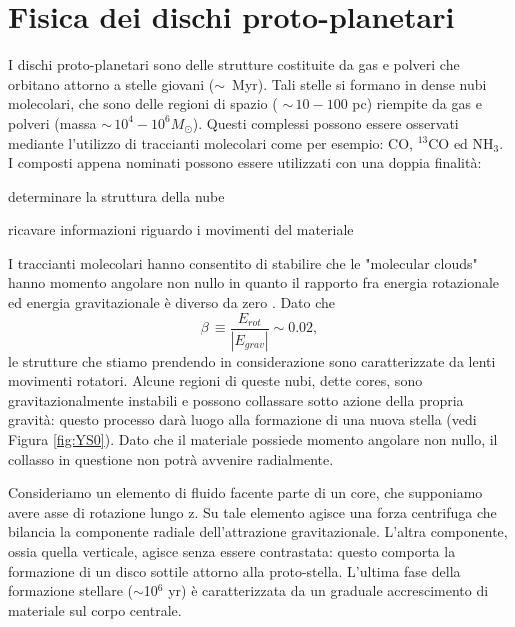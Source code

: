 \chapter{Fisica dei dischi proto-planetari} \label{cap:FisDischi}
I dischi proto-planetari sono delle strutture costituite da gas e polveri che orbitano attorno a stelle giovani ($\sim\,$ Myr). Tali stelle si formano in dense nubi molecolari, che sono delle regioni di spazio ( $\sim\,10 - 100$ pc) riempite da gas e polveri (massa $\sim\,10^4 - 10^6 M_{\odot}$). 
Questi complessi possono essere osservati mediante l'utilizzo di traccianti molecolari come per esempio: CO, $^{13}$CO ed NH$_3$. I composti appena nominati possono essere utilizzati con una doppia finalità: 
\begin{list}{\textbf{-}}{\setlength{\itemsep}{0cm}}
    \item determinare la struttura della nube
    \item ricavare informazioni riguardo i movimenti del materiale
\end{list}
I traccianti molecolari hanno consentito di stabilire che le "molecular clouds" hanno momento angolare non nullo in quanto il rapporto fra energia rotazionale ed energia gravitazionale è diverso da zero \parencite{Goodman1993}.
Dato che 
\begin{equation}
\beta\,\equiv\frac{E_{rot}}{\left|E_{grav}\right|} \sim 0.02, 
\label{eq:beta}
\end{equation}
le strutture che stiamo prendendo in considerazione sono caratterizzate da lenti movimenti rotatori.
Alcune regioni di queste nubi, dette cores, sono gravitazionalmente instabili e possono collassare sotto azione della propria gravità: questo processo darà luogo alla formazione di una nuova stella (vedi Figura \ref{fig:YS0}).
Dato che il materiale possiede momento angolare non nullo, il collasso in questione non potrà avvenire radialmente.

Consideriamo un elemento di fluido facente parte di un core, che supponiamo avere asse di rotazione lungo z.
Su tale elemento agisce una forza centrifuga che bilancia la componente radiale dell'attrazione gravitazionale. L'altra componente, ossia quella verticale, agisce senza essere contrastata: questo comporta la formazione di un disco sottile attorno alla proto-stella. 
L'ultima fase della formazione stellare ($\sim$10$^6$ yr) è caratterizzata da un graduale accrescimento di materiale sul corpo centrale. 

